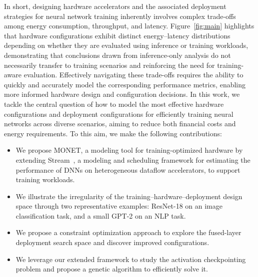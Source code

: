 \documentclass[lettersize,journal]{IEEEtran}
\begin{document}

In short, designing hardware accelerators and the associated deployment strategies for neural network training inherently involves complex trade-offs among energy consumption, throughput, and latency. Figure~\ref{fig:main} highlights that hardware configurations exhibit distinct energy–latency distributions depending on whether they are evaluated using inference or training workloads, demonstrating that conclusions drawn from inference-only analysis do not necessarily transfer to training scenarios and reinforcing the need for training-aware evaluation. Effectively navigating these trade-offs requires the ability to quickly and accurately model the corresponding performance metrics, enabling more informed hardware design and configuration decisions.
In this work, we tackle the central question of how to model the most effective hardware configurations and deployment configurations for efficiently training neural networks across diverse scenarios, aiming to reduce both financial costs and energy requirements. To this aim, we make the following contributions:


\begin{itemize}
    \item We propose MONET, a modeling tool for training-optimized hardware by extending Stream~\cite{symons2024stream}, a modeling and scheduling framework for estimating the performance of DNNs on heterogeneous dataflow accelerators, to support training workloads.
    
    \item We illustrate the irregularity of the training–hardware–deployment design space through two representative examples: ResNet-18 on an image classification task, and a small GPT-2 on an NLP task.
    
    \item We propose a constraint optimization approach to explore the fused-layer deployment search space and discover improved configurations.
    
    \item We leverage our extended framework to study the activation checkpointing problem and propose a genetic algorithm to efficiently solve it.
\end{itemize}
\end{document}
